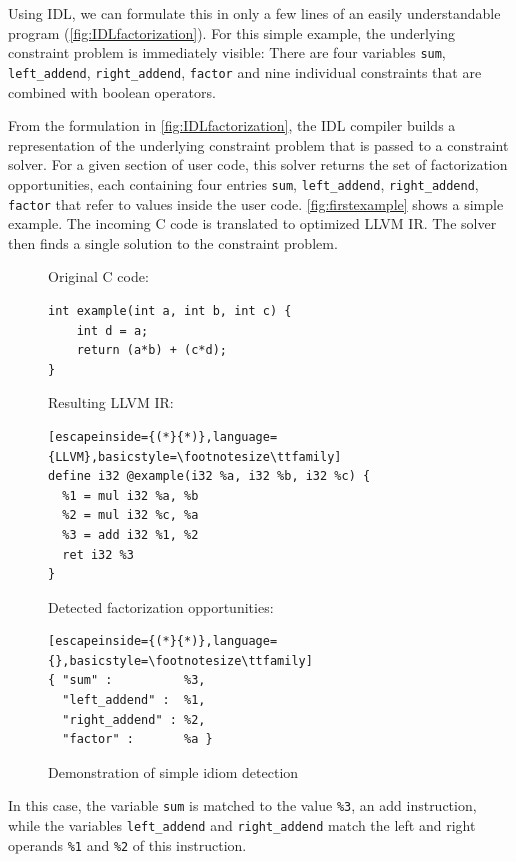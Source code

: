 Using IDL,  we can formulate this in only a few lines of an easily understandable program (\autoref{fig:IDLfactorization}).
For this simple example, the underlying constraint problem is immediately visible: There are four variables
\texttt{sum}, \texttt{left\_addend}, \texttt{right\_addend}, \texttt{factor} and nine individual constraints
that are combined with boolean operators.

\pagebreak

From the formulation in \autoref{fig:IDLfactorization}, the IDL compiler builds a representation of the underlying constraint problem that is passed to a constraint solver.
For a given section of user code, this solver returns the set of factorization opportunities, each containing four entries
\texttt{sum}, \texttt{left\_addend}, \texttt{right\_addend}, \texttt{factor} that refer to values inside the user code.
\autoref{fig:firstexample} shows a simple example.
The incoming C code is translated to optimized LLVM IR.
The solver then finds a single solution to the constraint problem.

\begin{figure}[h]
Original C code:
\begin{lstlisting}[basicstyle=\footnotesize\ttfamily]
int example(int a, int b, int c) {
    int d = a;
    return (a*b) + (c*d);
}
\end{lstlisting}
\vspace{1em}
Resulting LLVM IR:
\begin{lstlisting}[escapeinside={(*}{*)},language={LLVM},basicstyle=\footnotesize\ttfamily]
define i32 @example(i32 %a, i32 %b, i32 %c) {
  %1 = mul i32 %a, %b
  %2 = mul i32 %c, %a
  %3 = add i32 %1, %2
  ret i32 %3
}
\end{lstlisting}
\vspace{1em}
Detected factorization opportunities:
\begin{lstlisting}[escapeinside={(*}{*)},language={},basicstyle=\footnotesize\ttfamily]
{ "sum" :          %3,
  "left_addend" :  %1,
  "right_addend" : %2,
  "factor" :       %a }
\end{lstlisting}
\vspace{-0.3cm}
\caption{Demonstration of simple idiom detection}
\label{fig:firstexample}
\end{figure}

In this case, the variable {\tt sum} is matched to the value {\tt \%3}, an add instruction, while the variables {\tt left\_addend} and {\tt right\_addend} match the left and right operands {\tt \%1} and {\tt \%2} of this instruction. 

